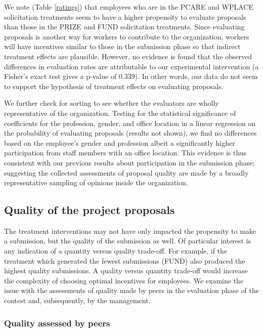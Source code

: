 \documentclass[11pt, titlepage]{article}
\begin{document}


We note (Table \ref{ratings}) that employees who are in the PCARE and
WPLACE solicitation treatments seem to have a higher propensity to
evaluate proposals than those in the PRIZE and FUND solicitation
treatments. Since evaluating proposals is another way for workers to
contribute to the organization, workers will have incentives similar to
those in the submission phase so that indirect treatment effects are
plausible. However, no evidence is found that the observed differences
in evaluation rates are attributable to our experimental intervention (a
Fisher's exact test gives a p-value of 0.339). In other words, our data
do not seem to support the hypothesis of treatment effects on evaluating
proposals.

We further check for sorting to see whether the evaluators are wholly
representative of the organization. Testing for the statistical
significance of coefficients for the profession, gender, and office
location in a linear regression on the probability of evaluating
proposals (results not shown), we find no differences based on the
employee's gender and profession albeit a significantly higher
participation from staff members with an office location. This evidence
is thus consistent with our previous results about participation in the
submission phase; suggesting the collected assessments of proposal
quality are made by a broadly representative sampling of opinions inside
the organization.

\subsection{Quality of the project
proposals}\label{quality-of-the-project-proposals}

The treatment interventions may not have only impacted the propensity to
make a submission, but the quality of the submission as well. Of
particular interest is any indication of a quantity versus quality
trade-off. For example, if the treatment which generated the fewest
submissions (FUND) also produced the highest quality submissions. A
quality versus quantity trade-off would increase the complexity of
choosing optimal incentives for employees. We examine the issue with the
assessments of quality made by peers in the evaluation phase of the
contest and, subsequently, by the management.

\subsubsection{Quality assessed by
peers}\label{quality-assessed-by-peers}
\end{document}
